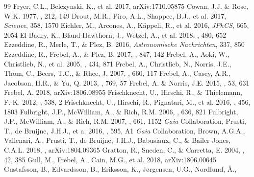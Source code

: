 \documentclass[preprint]{aastex61}
\begin{document}
{\begin{thebibliography}{99}
  Fryer, C.L., Belczynski, K., et al. 2017, arXiv:1710.05875
 Cowan, J.J. \& Rose,
  W.K. 1977, \apj, 212, 149
 Drout, M.R., Piro, A.L.,
  Shappee, B.J., et al. 2017, {\it Science}, 358, 1570
 Eichler, M., Arcones,
A., K\"{a}ppeli, R., et al. 2016, {\it JPhCS}, 665, 2054
 El-Badry, K.,
  Bland-Hawthorn, J., Wetzel, A., et al. 2018, \mnras, 480, 652
 Ezzeddine, R., Merle,
  T., \& Plez, B. 2016, {\it Astronomische Nachrichten}, 337, 850
 Ezzeddine, R.,
  Frebel, A., \& Plez, B. 2017, \apj, 847, 142
 Frebel, A., Aoki, W.,
  Christlieb, N., et al. 2005, \nat, 434, 871
 Frebel, A., Christlieb, N.,
  Norris, J.E., Thom, C., Beers, T.C., \& Rhee, J. 2007, \apj, 660,
  117
 Frebel, A., Casey, A.R.,
  Jacobson, H.R., \& Yu, Q. 2013, \apj, 769, 57
 Frebel, A. \&
  Norris, J.E. 2015, \araa, 53, 631
 Frebel, A. 2018, arXiv:1806.08955
 Frischknecht,
  U., Hirschi, R., \& Thielemann, F.-K. 2012, \aap, 538, 2
 Frischknecht,
  U., Hirschi, R., Pignatari, M., et al. 2016, \mnras, 456, 1803
 Fulbright, J.P.,
  McWilliam, A., \& Rich, R.M. 2006, \apj, 636, 821
 Fulbright, J.P.,
  McWilliam, A., \& Rich, R.M. 2007, \apj, 661, 1152
 {\it Gaia}
  Collaboration, Prusti, T., de Bruijne, J.H.J., et a. 2016, \aap,
  595, A1
 {\it Gaia}
  Collaboration, Brown, A.G.A., Vallenari, A., Prusti, T., de Bruijne,
  J.H.J., Babusiaux, C., \& Bailer-Jones, C.A.L. 2018, \aap,
  arXiv:1804.09365
 Gratton, R., Sneden, C.,
  \& Carretta, E. 2004, \araa, 42, 385
 Gull, M., Frebel, A., Cain,
  M.G., et al. 2018, arXiv:1806.00645
 Gustafsson, B.,
  Edvardsson, B., Eriksson, K., J{\o}rgensen, U.G., Nordlund, {\AA}.,

\end{thebibliography}}
\end{document}
